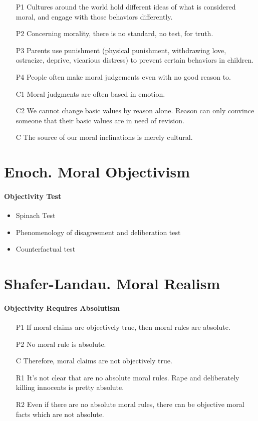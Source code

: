 \documentclass[12pt]{article}
\begin{document}
\begin{itemize}
    \item [P1] Cultures around the world hold different ideas of what is considered moral, and engage with those behaviors differently.
    \item [P2] Concerning morality, there is no standard, no test, for truth.
    \item [P3] Parents use punishment (physical punishment, withdrawing love, ostracize, deprive, vicarious distress) to prevent certain behaviors in children.
    \item [P4] People often make moral judgements even with no good reason to.
    \item [C1] Moral judgments are often based in emotion.
    \item [C2] We cannot change basic values by reason alone. Reason can only convince someone that their basic values are in need of revision.
    \item [C] The source of our moral inclinations is merely cultural.
\end{itemize}

\section{Enoch. Moral Objectivism}

\paragraph{Objectivity Test}
\begin{itemize}
    \item Spinach Test
    \item Phenomenology of disagreement and deliberation test
    \item Counterfactual test
\end{itemize}

\section{Shafer-Landau. Moral Realism}

\paragraph{Objectivity Requires Absolutism}
\begin{itemize}
    \item [P1] If moral claims are objectively true, then moral rules are absolute.
    \item [P2] No moral rule is absolute.
    \item [C] Therefore, moral claims are not objectively true.
    \item [R1] It's not clear that are no absolute moral rules. Rape and deliberately killing innocents is pretty absolute.
    \item [R2] Even if there are no absolute moral rules, there can be objective moral facts which are not absolute.
\end{itemize}
\end{document}
